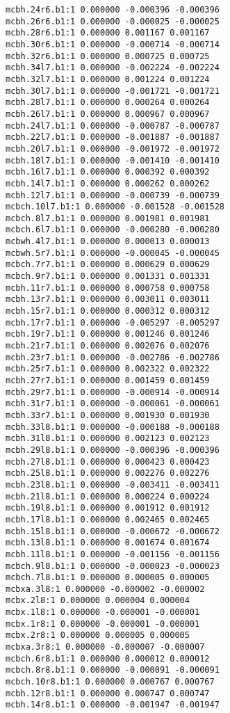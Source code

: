 \begin{verbatim}
mcbh.24r6.b1:1 0.000000 -0.000396 -0.000396
mcbh.26r6.b1:1 0.000000 -0.000025 -0.000025
mcbh.28r6.b1:1 0.000000 0.001167 0.001167
mcbh.30r6.b1:1 0.000000 -0.000714 -0.000714
mcbh.32r6.b1:1 0.000000 0.000725 0.000725
mcbh.34l7.b1:1 0.000000 -0.002224 -0.002224
mcbh.32l7.b1:1 0.000000 0.001224 0.001224
mcbh.30l7.b1:1 0.000000 -0.001721 -0.001721
mcbh.28l7.b1:1 0.000000 0.000264 0.000264
mcbh.26l7.b1:1 0.000000 0.000967 0.000967
mcbh.24l7.b1:1 0.000000 -0.000787 -0.000787
mcbh.22l7.b1:1 0.000000 -0.001887 -0.001887
mcbh.20l7.b1:1 0.000000 -0.001972 -0.001972
mcbh.18l7.b1:1 0.000000 -0.001410 -0.001410
mcbh.16l7.b1:1 0.000000 0.000392 0.000392
mcbh.14l7.b1:1 0.000000 0.000262 0.000262
mcbh.12l7.b1:1 0.000000 -0.000739 -0.000739
mcbch.10l7.b1:1 0.000000 -0.001528 -0.001528
mcbch.8l7.b1:1 0.000000 0.001981 0.001981
mcbch.6l7.b1:1 0.000000 -0.000280 -0.000280
mcbwh.4l7.b1:1 0.000000 0.000013 0.000013
mcbwh.5r7.b1:1 0.000000 -0.000045 -0.000045
mcbch.7r7.b1:1 0.000000 0.000629 0.000629
mcbch.9r7.b1:1 0.000000 0.001331 0.001331
mcbh.11r7.b1:1 0.000000 0.000758 0.000758
mcbh.13r7.b1:1 0.000000 0.003011 0.003011
mcbh.15r7.b1:1 0.000000 0.000312 0.000312
mcbh.17r7.b1:1 0.000000 -0.005297 -0.005297
mcbh.19r7.b1:1 0.000000 0.001246 0.001246
mcbh.21r7.b1:1 0.000000 0.002076 0.002076
mcbh.23r7.b1:1 0.000000 -0.002786 -0.002786
mcbh.25r7.b1:1 0.000000 0.002322 0.002322
mcbh.27r7.b1:1 0.000000 0.001459 0.001459
mcbh.29r7.b1:1 0.000000 -0.000914 -0.000914
mcbh.31r7.b1:1 0.000000 -0.000061 -0.000061
mcbh.33r7.b1:1 0.000000 0.001930 0.001930
mcbh.33l8.b1:1 0.000000 -0.000188 -0.000188
mcbh.31l8.b1:1 0.000000 0.002123 0.002123
mcbh.29l8.b1:1 0.000000 -0.000396 -0.000396
mcbh.27l8.b1:1 0.000000 0.000423 0.000423
mcbh.25l8.b1:1 0.000000 0.002276 0.002276
mcbh.23l8.b1:1 0.000000 -0.003411 -0.003411
mcbh.21l8.b1:1 0.000000 0.000224 0.000224
mcbh.19l8.b1:1 0.000000 0.001912 0.001912
mcbh.17l8.b1:1 0.000000 0.002465 0.002465
mcbh.15l8.b1:1 0.000000 -0.000672 -0.000672
mcbh.13l8.b1:1 0.000000 0.001674 0.001674
mcbh.11l8.b1:1 0.000000 -0.001156 -0.001156
mcbch.9l8.b1:1 0.000000 -0.000023 -0.000023
mcbch.7l8.b1:1 0.000000 0.000005 0.000005
mcbxa.3l8:1 0.000000 -0.000002 -0.000002
mcbx.2l8:1 0.000000 0.000004 0.000004
mcbx.1l8:1 0.000000 -0.000001 -0.000001
mcbx.1r8:1 0.000000 -0.000001 -0.000001
mcbx.2r8:1 0.000000 0.000005 0.000005
mcbxa.3r8:1 0.000000 -0.000007 -0.000007
mcbch.6r8.b1:1 0.000000 0.000012 0.000012
mcbch.8r8.b1:1 0.000000 -0.000091 -0.000091
mcbch.10r8.b1:1 0.000000 0.000767 0.000767
mcbh.12r8.b1:1 0.000000 0.000747 0.000747
mcbh.14r8.b1:1 0.000000 -0.001947 -0.001947

\end{verbatim}
